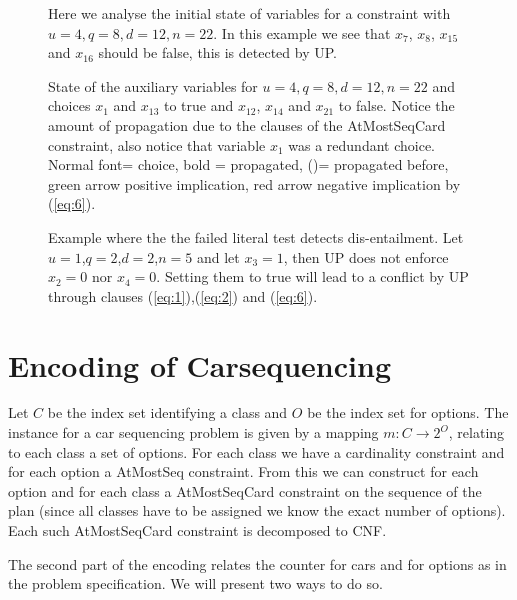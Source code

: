 \documentclass[]{llncs}
\newcommand{\AtMostSeqCard}{AtMostSeqCard }
\begin{document}
\begin{figure}
\centering 
\caption{Here we analyse the initial state of variables for a constraint
with $u=4,q=8,d=12,n=22$. In this example we see that $x_{7}$, $x_{8}$,
$x_{15}$ and $x_{16}$ should be false, this is detected by UP.}
%
\label{fig3}
\end{figure}

\begin{figure}
\centering 
\caption{State of the auxiliary variables for $u=4,q=8,d=12,n=22$ and
    choices $x_{1}$ and $x_{13}$ to true and $x_{12}$, $x_{14}$ and
    $x_{21}$ to false. Notice the amount of propagation due to the
    clauses of the \AtMostSeqCard constraint, also notice that variable
$x_{1}$ was a redundant choice. Normal font= choice, bold = propagated,
()= propagated before, green arrow positive implication, red arrow
negative implication by (\ref{eq:6}).}
%
\label{fig4}
\end{figure}                                                

\begin{figure}
\centering 
\caption{ Example where the the failed literal test detects
dis-entailment.  Let $u=1$,$q=2$,$d=2$,$n=5$ and let $x_3=1$, then UP
does not enforce $x_2=0$ nor $x_4=0$. Setting them to true will lead to
a conflict by UP through clauses (\ref{eq:1}),(\ref{eq:2}) and
(\ref{eq:6}).}
%
\label{ex:5}
\end{figure}


\section{Encoding of Carsequencing}


Let $C$ be the index set identifying a class and $O$ be the index set
for options. The instance for a car sequencing problem is given by a
mapping $m : C\rightarrow 2^O$, relating to each class a set of options.
For each class we have a cardinality constraint and for each option a
AtMostSeq constraint. From this we can construct for each option and for
each class a \AtMostSeqCard constraint on the sequence of the plan
(since all classes have to be assigned we know the exact number of
options).  Each such \AtMostSeqCard constraint is decomposed to CNF. 


The second part of the encoding relates the counter for cars and for
options as in the problem specification.  We will present two ways to do
so. 
\end{document}
